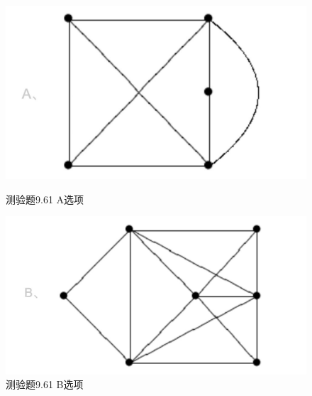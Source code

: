 \documentclass[UTF8, heading=true]{ctexart}
\begin{document}
\begin{figure}[htbp]
    \centering
    \begin{minipage}[t]{0.35\textwidth}
        \centering
        \includegraphics[width=1\textwidth]{9.61_1.jpg} %
	      \vspace{-0.3cm}
        \caption{测验题9.61 A选项}
    \end{minipage}
	  \hspace{0.1\textwidth} %
    \begin{minipage}[t]{0.35\textwidth}
        \centering
        \includegraphics[width=1\textwidth]{9.61_2.jpg} %
	      \vspace{-0.3cm}
        \caption{测验题9.61 B选项}
\end{minipage}
\end{figure}
\end{document}
